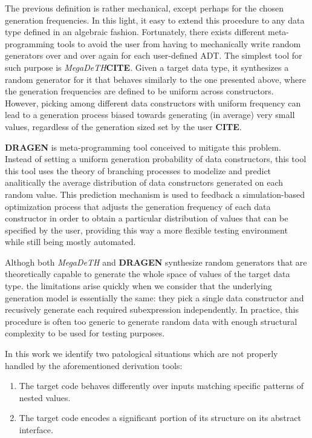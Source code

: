 \documentclass[conference, fleqn]{IEEEtran}
\newcommand{\tocite}{\textbf{CITE}}
\newcommand{\megadeth}{\emph{MegaDeTH}\xspace}
\newcommand{\dragen}{\textbf{DRAGEN}\xspace}
\begin{document}
The previous definition is rather mechanical, except perhaps for the chosen
generation frequencies.
%
In this light, it easy to extend this procedure to any data type defined in an
algebraic fashion.
%
Fortunately, there exists different meta-programming tools to avoid the user
from having to mechanically write random generators over and over again for each
user-defined ADT.
%
The simplest tool for such purpose is \megadeth \tocite.
%
Given a target data type, it synthesizes a random generator for it that behaves
similarly to the one presented above, where the generation frequencies are
defined to be uniform across constructors.
%
However, picking among different data constructors with uniform frequency can
lead to a generation process biased towards generating (in average) very small
values, regardless of the generation sized set by the user \tocite.


\dragen is meta-programming tool conceived to mitigate this problem.
%
Instead of setting a uniform generation probability of data constructors, this
tool this tool uses the theory of branching processes to modelize and predict
analitically the average distribution of data constructors generated on each
random value.
%
This prediction mechanism is used to feedback a simulation-based optimization
process that adjusts the generation frequency of each data constructor in order
to obtain a particular distribution of values that can be specified by the user,
providing this way a more flexible testing environment while still being mostly
automated.


Althogh both \megadeth and \dragen synthesize random generators that are
theoretically capable to generate the whole space of values of the target data
type. the limitations arise quickly when we consider that the underlying
generation model is essentially the same: they pick a single data constructor
and recusively generate each required subexpression independently.
%
In practice, this procedure is often too generic to generate random data with
enough structural complexity to be used for testing purposes.



In this work we identify two patological situations which are not properly
handled by the aforementioned derivation tools:

\begin{enumerate}
\item The target code behaves differently over inputs matching specific patterns
  of nested values.
\item The target code encodes a significant portion of its structure on its
  abstract interface.
\end{enumerate}
\end{document}
